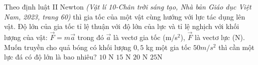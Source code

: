 

\begin{ex}%
	Theo định luật II Newton \textit{(Vật lí 10-Chân trời sáng tạo, Nhà bản Giáo dục Việt Nam, 2023, trang 60)} thì gia tốc của một vật cùng hướng với lực tác dụng lên vật. Độ lớn của  gia tốc tỉ lệ thuận với độ lớn của lực và tỉ lệ nghịch với khối lượng của vật: $\overrightarrow{F}=m\overrightarrow{a}$ trong đó $\overrightarrow{a}$ là vectơ gia tốc (m/s$^2$), $\overrightarrow{F}$ là vectơ lực (N).
	Muốn truyền cho quả bóng có khối lượng $0,5$ kg một gia tốc $50 m/s^2$ thì cần một lực đá có  độ lớn là bao nhiêu?
	 \choice
		{$10$  N}
		 {$15$ N}
		{$20$  N}
		{\True $25 $N} 
\end{ex}

